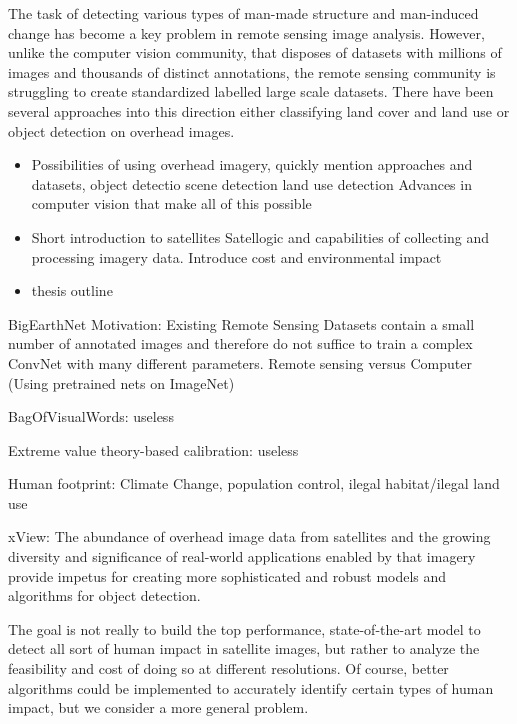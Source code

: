 The task of detecting various types of man-made structure and man-induced change has become a key problem in remote sensing image analysis. However, unlike the computer vision community, that disposes of datasets with millions of images and thousands of distinct annotations, the remote sensing community is struggling to create standardized labelled large scale datasets. There have been several approaches into this direction either classifying land cover and land use or object detection on overhead images.


\begin{itemize}
\item Possibilities of using overhead imagery, quickly mention approaches and datasets, object detectio scene detection  land use detection Advances in computer vision that make all of this possible
\item Short introduction to satellites Satellogic and capabilities of collecting and processing imagery data. Introduce cost and environmental impact
\item thesis outline
\end{itemize}



BigEarthNet Motivation:
Existing Remote Sensing Datasets contain a small number of annotated images and therefore do not suffice to train a complex ConvNet with many different parameters.
Remote sensing versus Computer (Using pretrained nets on ImageNet)


BagOfVisualWords: useless

Extreme value theory-based calibration: useless

Human footprint: Climate Change, population control, ilegal habitat/ilegal land use

xView: The abundance of overhead image data from
satellites and the growing diversity and significance of real-world applications enabled by that
imagery provide impetus for creating more sophisticated and robust models and algorithms for object detection.


The goal is not really to build the top performance, state-of-the-art model to detect all sort of human impact in satellite images, but rather to analyze the feasibility and cost of doing so at different resolutions. Of course, better algorithms could be implemented to accurately identify certain types of human impact, but we consider a more general problem.

